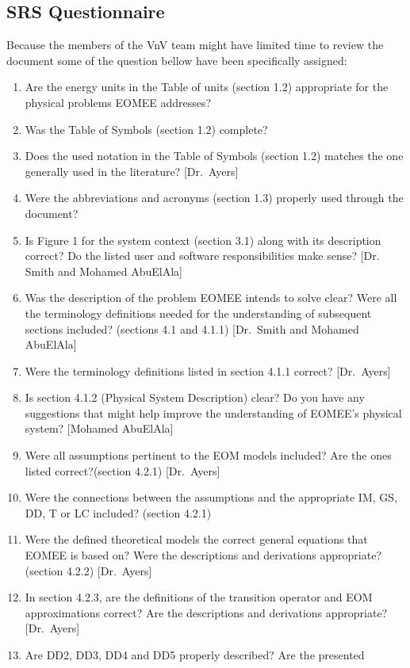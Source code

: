 \documentclass[12pt, titlepage]{article}
\begin{document}
\subsection{SRS Questionnaire}
Because the members of the VnV team might have limited time to review the 
document some of the question bellow have been specifically assigned:
\begin{enumerate}
	\item Are the energy units in the Table of units (section 1.2) appropriate 
	for the physical problems EOMEE addresses?
	\item Was the Table of Symbols (section 1.2) complete? 
	\item Does the used notation in the Table of Symbols (section 1.2) matches 
	the one generally used in the literature? [Dr.\ Ayers]
	\item Were the abbreviations and acronyms (section 1.3) properly used 
	through the document?
	\item Is Figure 1 for the system context (section 3.1) along with its 
	description correct? Do the listed user and software responsibilities make 
	sense? [Dr. Smith and Mohamed AbuElAla]
	\item Was the description of the problem EOMEE intends to solve clear? Were 
	all the terminology definitions needed for the understanding of subsequent 
	sections included? (sections 4.1 and 4.1.1) [Dr.\ Smith 
	and Mohamed AbuElAla]
	\item Were the terminology definitions listed in section 4.1.1 correct? 
	[Dr.\ Ayers]
	\item Is section 4.1.2 (Physical System Description) clear? Do you have any 
	suggestions that might help improve the understanding of EOMEE's physical 
	system? [Mohamed AbuElAla]
	\item Were all assumptions pertinent to the EOM models included? Are the 
	ones listed correct?(section 4.2.1) [Dr.\ Ayers]
	\item Were the connections between the assumptions and the appropriate IM, 
	GS, DD, T or LC included? (section 4.2.1)
	\item Were the defined theoretical models the correct general equations 
	that EOMEE is based on? Were the descriptions and derivations appropriate? 
	(section 4.2.2) [Dr.\ Ayers]
	\item In section 4.2.3, are the definitions of the transition operator and 
	EOM approximations correct? Are the descriptions and derivations 
	appropriate? [Dr.\ Ayers]
	\item Are DD2, DD3, DD4 and DD5 properly described? Are the presented 

\end{enumerate}
\end{document}
